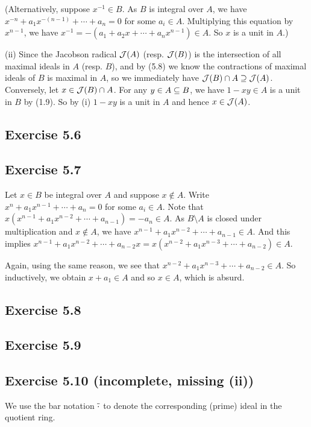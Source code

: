 \documentclass[../A&M.tex]{subfiles}
\begin{document}
(Alternatively, suppose $x^{-1} \in B$. As $B$ is integral over $A$, we have $x^{-n}+a_1x^{-(n-1)}+\cdots+a_n=0$ for some $a_i\in A$. Multiplying this equation by $x^{n-1}$, we have $x^{-1} = -(a_1+a_2x+\cdots+a_nx^{n-1}) \in A$. So $x$ is a unit in $A$.)

(ii) Since the Jacobson radical $\mathcal{J}(A)$ (resp. $\mathcal{J}(B)$) is the intersection of all maximal ideals in $A$ (resp. $B$), and by (5.8) we know the contractions of maximal ideals of $B$ is maximal in $A$, so we immediately have $\mathcal{J}(B) \cap A \supseteq \mathcal{J}(A)$. Conversely, let $x \in \mathcal{J}(B) \cap A$. For any $y \in A \subseteq B$, we have $1-xy \in A$ is a unit in $B$ by (1.9). So by (i) $1-xy$ is a unit in $A$ and hence $x \in \mathcal{J}(A)$.

\subsection*{Exercise 5.6}

\subsection*{Exercise 5.7}

Let $x\in B$ be integral over $A$ and suppose $x\notin A$. Write $x^n+a_1x^{n-1}+\cdots+a_n=0$ for some $a_i\in A$. Note that $x(x^{n-1}+a_1x^{n-2}+\cdots+a_{n-1}) = -a_n \in A$. As $B \setminus A$ is closed under multiplication and $x\notin A$, we have $x^{n-1}+a_1x^{n-2}+\cdots+a_{n-1} \in A$. And this implies $x^{n-1}+a_1x^{n-2}+\cdots+a_{n-2}x = x(x^{n-2}+a_1x^{n-3}+\cdots+a_{n-2}) \in A$.

Again, using the same reason, we see that $x^{n-2}+a_1x^{n-3}+\cdots+a_{n-2} \in A$. So inductively, we obtain $x+a_1 \in A$ and so $x \in A$, which is absurd.

\subsection*{Exercise 5.8}

\subsection*{Exercise 5.9}

\subsection*{Exercise 5.10 \color{red}(incomplete, missing (ii))}

We use the bar notation $\overline{\cdot}$ to denote the corresponding (prime) ideal in the quotient ring.
\end{document}
